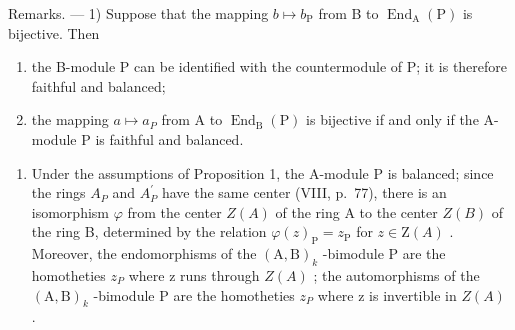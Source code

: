 Remarks. --- 1) Suppose that the mapping \(b \mapsto b_{\mathrm{P}}\) from B to \(\operatorname{End}_{\mathrm{A}}(\mathrm{P})\) is bijective. Then

\begin{enumerate}
\def\labelenumi{\alph{enumi})}
\item
  the B-module P can be identified with the countermodule of P; it is therefore faithful and balanced;
\item
  the mapping \(a \mapsto a_{P}\) from A to \(\operatorname{End}_{\mathrm{B}}(\mathrm{P})\) is bijective if and only if the A-module P is faithful and balanced.
\end{enumerate}

\begin{enumerate}
\def\labelenumi{\arabic{enumi})}
\setcounter{enumi}{1}
\tightlist
\item
  Under the assumptions of Proposition 1, the A-module P is balanced; since the rings \(A_{P}\) and \(A_{P}^{\prime}\) have the same center (VIII, p.~77), there is an isomorphism \(\varphi\) from the center \(Z(A)\) of the ring A to the center \(Z(B)\) of the ring B, determined by the relation \(\varphi(z)_{\mathrm{P}} = z_{\mathrm{P}}\) for \(z \in \mathrm{Z}(A)\) . Moreover, the endomorphisms of the \((\mathrm{A}, \mathrm{B})_{k}\) -bimodule P are the homotheties \(z_{P}\) where z runs through \(Z(A)\) ; the automorphisms of the \((\mathrm{A}, \mathrm{B})_{k}\) -bimodule P are the homotheties \(z_{P}\) where z is invertible in \(Z(A)\) .
\end{enumerate}
